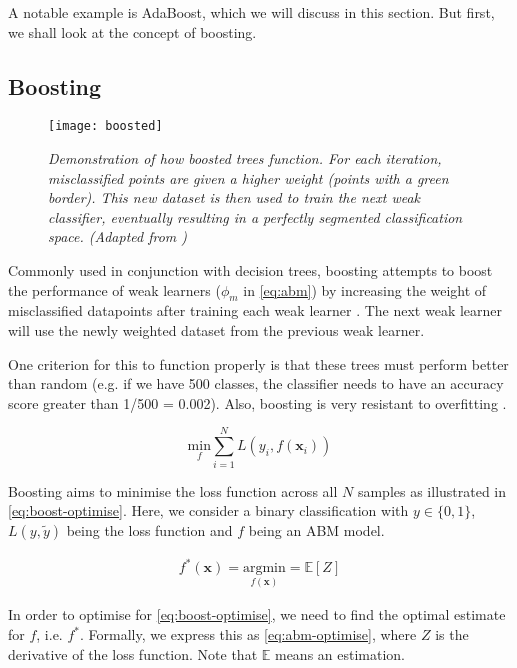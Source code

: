 A notable example is AdaBoost, which we will discuss in this section. But first, we shall look at the concept of boosting. 

\subsection{Boosting}
\begin{figure}[H]
  \centering
  \texttt{[image: boosted]}
  \caption{\textit{Demonstration of how boosted trees function. For each iteration, misclassified points are given a higher weight (points with a green border). This new dataset is then used to train the next weak classifier, eventually resulting in a perfectly segmented classification space. (Adapted from \protect{})}}
  \label{fig:boosted}
\end{figure}

Commonly used in conjunction with decision trees, boosting attempts to boost the performance of weak learners ($\phi_m$ in \autoref{eq:abm}) by increasing the weight of misclassified datapoints after training each weak learner \cite{boosting}. The next weak learner will use the newly weighted dataset from the previous weak learner.

One criterion for this to function properly is that these trees must perform better than random (e.g. if we have 500 classes, the classifier needs to have an accuracy score greater than 1/500 = 0.002). Also, boosting is very resistant to overfitting \cite{mur-book}.

\begin{equation} \label{eq:boost-optimise}
  \underset{f}{\mathrm{min}} \sum_{i=1}^{N} L(y_i, f(\mathbf{x}_i))
\end{equation}

Boosting aims to minimise the loss function across all $N$ samples as illustrated in \autoref{eq:boost-optimise}. Here, we consider a binary classification with $y \in \{0,1\}$, $L(y, \tilde{y})$ being the loss function and $f$ being an ABM model.

\begin{align} \label{eq:abm-optimise}
  f^{*}(\mathbf{x}) = \underset{f(\mathbf{x})}{\mathrm{argmin}} = \mathbb{E}[Z]
\end{align}

In order to optimise for \autoref{eq:boost-optimise}, we need to find the optimal estimate for $f$, i.e. $f^{*}$. Formally, we express this as \autoref{eq:abm-optimise}, where $Z$ is the derivative of the loss function. Note that $\mathbb{E}$ means an estimation.

